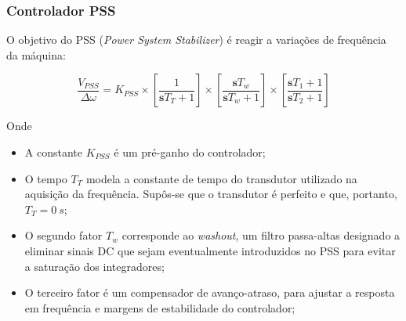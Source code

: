 \documentclass[10pt, compress,xcolor={svgnames,dvipsnames,x11names}]{beamer}
\begin{document}
\begin{frame}%
\frametitle{Controlador PSS}
\scriptsize

	O objetivo do PSS (\textit{Power System Stabilizer}) é reagir a variações de frequência da máquina:

\begin{equation}
\frac{V_{PSS}}{\Delta \omega} = K_{PSS}\times \left[\frac{1}{\mathbf{s}T_T + 1}\right]\times \left[ \frac{\mathbf{s}T_w}{\mathbf{s}T_w + 1} \right] \times \left[ \frac{\mathbf{s}T_1 + 1}{\mathbf{s}T_2 + 1} \right]
\end{equation}

	Onde

\begin{itemize}
	\item A constante $K_{PSS}$ é um pré-ganho do controlador;
	\item O tempo $T_T$ modela a constante de tempo do transdutor utilizado na aquisição da frequência. Supôs-se que o transdutor é perfeito e que, portanto, $T_T = 0\ s$;
	\item O segundo fator $T_w$ corresponde ao \textit{washout}, um filtro passa-altas designado a eliminar sinais DC que sejam eventualmente introduzidos no PSS para evitar a saturação dos integradores;
	\item O terceiro fator é um compensador de avanço-atraso, para ajustar a resposta em frequência e margens de estabilidade do controlador;
\end{itemize}

\normalsize
\end{frame}%
\end{document}
